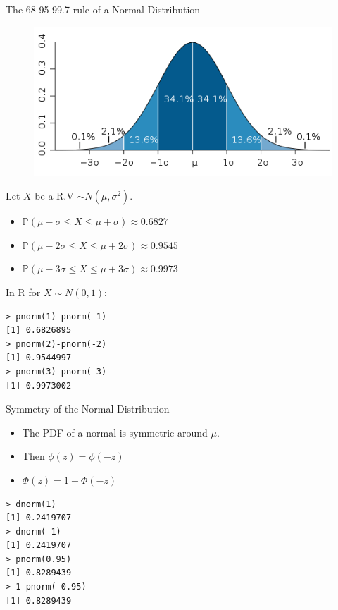 \documentclass[handout]{beamer}
\begin{document}
\begin{frame}[fragile]{The 68-95-99.7 rule of a Normal Distribution}
\scriptsize{
\begin{figure}[h!]
	\centering
	\includegraphics[scale=0.3]{pics/gaussian.png}
\end{figure} 
Let $X$ be a R.V $\sim N(\mu,\sigma^2)$.
\begin{itemize}
 \item $\mathbb{P}( \mu - \sigma \leq X \leq \mu+ \sigma) \approx 0.6827$  
 \item $\mathbb{P}( \mu - 2 \sigma \leq X \leq \mu+ 2 \sigma) \approx 0.9545$               
 \item $\mathbb{P}( \mu - 3 \sigma \leq X \leq \mu+ 3 \sigma) \approx 0.9973$ 

\end{itemize}
In R for $X\sim N(0,1)$:
\begin{verbatim}
> pnorm(1)-pnorm(-1)
[1] 0.6826895
> pnorm(2)-pnorm(-2)
[1] 0.9544997
> pnorm(3)-pnorm(-3)
[1] 0.9973002 
\end{verbatim}
}
\end{frame}

\begin{frame}[fragile]{Symmetry of the Normal Distribution}
\begin{itemize}
 \item The PDF of a normal is symmetric around $\mu$.
 \item Then $\phi(z)= \phi(-z) $ 
 \item $\Phi(z)=1-\Phi(-z)$
\end{itemize}
\begin{verbatim}
> dnorm(1)
[1] 0.2419707
> dnorm(-1)
[1] 0.2419707
> pnorm(0.95)
[1] 0.8289439
> 1-pnorm(-0.95)
[1] 0.8289439 
\end{verbatim}


\end{frame}
\end{document}

